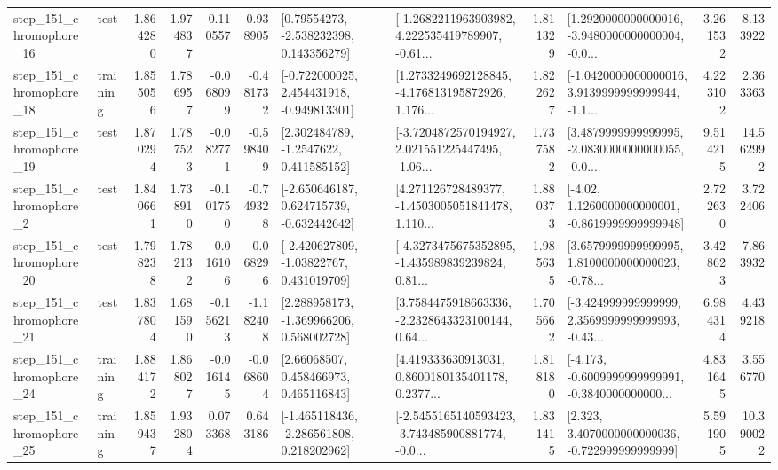 \begin{tabular}{llrrrrllrlrr}
  step\_151\_chromophore\_16 &      test &      1.864280 &    1.974837 &      0.110557 &  0.938905 &     [0.79554273, -2.538232398, 0.143356279] &  [-1.2682211963903982, 4.222535419789907, -0.61... &       1.811329 &  [1.2920000000000016, -3.9480000000000004, -0.0... &            3.261532 &          8.133922 \\
  step\_151\_chromophore\_18 &  training &      1.855056 &    1.786957 &     -0.068099 & -0.481732 &   [-0.722000025, 2.454431918, -0.949813301] &  [1.2733249692128845, -4.176813195872926, 1.176... &       1.822627 &  [-1.0420000000000016, 3.9139999999999944, -1.1... &            4.223102 &          2.363363 \\
  step\_151\_chromophore\_19 &      test &      1.870294 &    1.787523 &     -0.082771 & -0.598409 &      [2.302484789, -1.2547622, 0.411585152] &  [-3.7204872570194927, 2.021551225447495, -1.06... &       1.737582 &  [3.4879999999999995, -2.0830000000000055, -0.0... &            9.514215 &         14.562992 \\
   step\_151\_chromophore\_2 &      test &      1.840661 &    1.738910 &     -0.101750 & -0.749328 &   [-2.650646187, 0.624715739, -0.632442642] &  [4.271126728489377, -1.4503005051841478, 1.110... &       1.880373 &   [-4.02, 1.1260000000000001, -0.8619999999999948] &            2.722630 &          3.722406 \\
  step\_151\_chromophore\_20 &      test &      1.798238 &    1.782132 &     -0.016106 & -0.068296 &    [-2.420627809, -1.03822767, 0.431019709] &  [-4.3273475675352895, -1.435989839239824, 0.81... &       1.985635 &  [3.6579999999999995, 1.8100000000000023, -0.78... &            3.428623 &          7.863932 \\
  step\_151\_chromophore\_21 &      test &      1.837804 &    1.681590 &     -0.156213 & -1.182408 &    [2.288958173, -1.369966206, 0.568002728] &  [3.7584475918663336, -2.2328643323100144, 0.64... &       1.705662 &  [-3.424999999999999, 2.3569999999999993, -0.43... &            6.984314 &          4.439218 \\
  step\_151\_chromophore\_24 &  training &      1.884172 &    1.868027 &     -0.016145 & -0.068604 &      [2.66068507, 0.458466973, 0.465116843] &  [4.419333630913031, 0.8600180135401178, 0.2377... &       1.818180 &  [-4.173, -0.6009999999999991, -0.3840000000000... &            4.831645 &          3.556770 \\
  step\_151\_chromophore\_25 &  training &      1.859437 &    1.932804 &      0.073368 &  0.643186 &   [-1.465118436, -2.286561808, 0.218202962] &  [-2.5455165140593423, -3.743485900881774, -0.0... &       1.831415 &    [2.323, 3.4070000000000036, -0.722999999999999] &            5.591905 &         10.390022 \\

\end{tabular}
